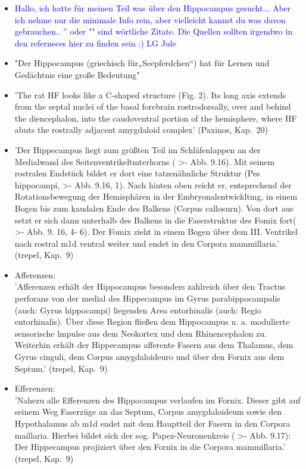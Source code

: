\documentclass[12pt,a4paper,pdftex]{article}
\begin{document}
\begin{itemize}

\item \textcolor{blue}{Hallo, ich hatte für meinen Teil was über den Hippocampus gesucht... Aber ich nehme nur die minimale Info rein, aber vielleicht kannst du was davon gebrauchen.. '' oder "" sind wörtliche Zitate. Die Quellen sollten irgendwo in den referneces hier zu finden sein :) LG Jule}

\item "Der Hippocampus (griechisch für„Seepferdchen“) hat für Lernen und Gedächtnis eine große Bedeutung" \cite[Kap.~7]{neurowissenschaften_baer}
	
\item 'The rat HF looks like a C-shaped structure (Fig. 2). Its long axis extends from the septal nuclei of the basal forebrain rostrodorsally, over and behind the diencephalon, into the caudoventral portion of the hemisphere, where HF abuts the rostrally adjacent amygdaloid complex' (Paxinos, Kap.~20)

\item 'Der Hippecampus liegt zum größten Teil im Schläfenlappen an der Medialwand des Seitenventrikeltmterhorns ( >- Abb. 9.16). Mit seinem rostralen Endstück bildet er dort eine tatzenähnliche Struktur (Pes hippocampi, >- Abb. 9.16, 1). Nach hinten oben reicht er, entsprechend der Rotationsbewegung der Hemisphären in der Embryonalentwickltmg, in einem Bogen bis zum kaudalen Ende des Balkens (Corpus callosurn). Von dort aus setzt er sich dann unterhalb des Balkens in die Faserstruktur
des Fomix fort( >- Abb. 9. 16, 4- 6). Der Fomix zieht in
einem Bogen über dem III. Ventrikel nach rostral m1d ventral weiter und endet in den Corpora mammillaria.' (trepel, Kap.~9)

\item Afferenzen:\\
'Afferenzen erhält der Hippocampus besonders zahlreich über den Tractus perforans von der medial des Hippecampus im Gyrus parabippocampalis (auch: Gyrus hippocampi) liegenden Area entorhinalis (auch: Regio entorhinalis). Über diese Region fließen dem Hippocampus u. a. modulierte sensorische lmpulse aus dem Neokortex und dem Rhinencephalon zu. Weiterhin erhält der Hippecampus afferente Fasern aus dem Thalamus, dem Gyrus cinguli, dem Corpus amygdaloideuro und über den Fornix aus dem Septum.' (trepel, Kap.~9)

\item Efferenzen:\\
'Nahezu alle Efferenzen des Hippocampus verlaufen im Fornix. Dieser gibt auf seinem Weg Faserzüge an das Septum, Corpus amygdaloideum sowie den Hypothalamus ab m1d endet mit dem Hauptteil der Fasern in den Corpora maillaria. Hierbei bildet sich der sog. Papez-Neuronenkreis ( >- Abb. 9.17): Der Hippecampus projiziert über den Fornix in die Corpora mammillaria.' (trepel, Kap.~9)


\end{itemize}
\end{document}
